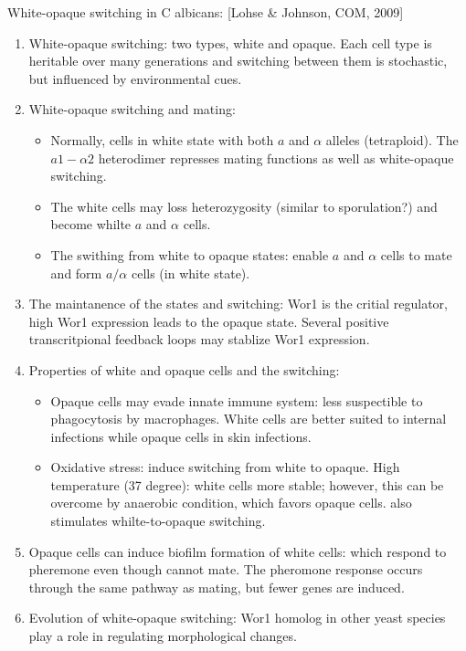 \documentclass{report}
\begin{document}
White-opaque switching in C albicans: [Lohse \& Johnson, COM, 2009]
\begin{enumerate}
	\item White-opaque switching: two types, white and opaque. Each cell type is heritable over many generations and switching between them is stochastic, but influenced by environmental cues. 
	
	\item White-opaque switching and mating: 
	\begin{itemize}
		\item Normally, cells in white state with both $a$ and $\alpha$ alleles (tetraploid). The $a1-\alpha2$ heterodimer represses mating functions as well as white-opaque switching.
		\item The white cells may loss heterozygosity (similar to sporulation?) and become whilte $a$ and $\alpha$ cells. 
		\item The swithing from white to opaque states: enable $a$ and $\alpha$ cells to mate and form $a/\alpha$ cells (in white state). 
	\end{itemize}
	
	\item The maintanence of the states and switching: Wor1 is the critial regulator, high Wor1 expression leads to the opaque state. Several positive transcritpional feedback loops may stablize Wor1 expression. 
	
	\item Properties of white and opaque cells and the switching: 
	\begin{itemize}
		\item Opaque cells may evade innate immune system: less suspectible to phagocytosis by macrophages. White cells are better suited to internal infections while opaque cells in skin infections. 
		\item Oxidative stress: induce switching from white to opaque. High temperature (37 degree): white cells more stable; however, this can be overcome by anaerobic condition, which favors opaque cells.  also stimulates whilte-to-opaque switching. 
	\end{itemize}
	
	\item Opaque cells can induce biofilm formation of white cells: which respond to pheremone even though cannot mate. The pheromone response occurs through the same pathway as mating, but fewer genes are induced. 
	
	\item Evolution of white-opaque switching: Wor1 homolog in other yeast species play a role in regulating morphological changes. 
\end{enumerate}
\end{document}
